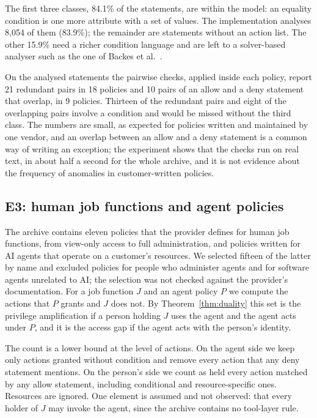 \documentclass[preprint,12pt]{elsarticle}
\theoremstyle{definition}
\theoremstyle{remark}
\begin{document}
The first three classes, 84.1\% of the statements, are within the model: an equality condition is one more attribute with a set of values. The implementation analyses 8,054 of them (83.9\%); the remainder are statements without an action list. The other 15.9\% need a richer condition language and are left to a solver-based analyser such as the one of Backes et al.~\cite{backes2018zelkova}.

On the analysed statements the pairwise checks, applied inside each policy, report 21 redundant pairs in 18 policies and 10 pairs of an allow and a deny statement that overlap, in 9 policies. Thirteen of the redundant pairs and eight of the overlapping pairs involve a condition and would be missed without the third class. The numbers are small, as expected for policies written and maintained by one vendor, and an overlap between an allow and a deny statement is a common way of writing an exception; the experiment shows that the checks run on real text, in about half a second for the whole archive, and it is not evidence about the frequency of anomalies in customer-written policies.

\subsection{E3: human job functions and agent policies}
The archive contains eleven policies that the provider defines for human job functions, from view-only access to full administration, and policies written for AI agents that operate on a customer's resources. We selected fifteen of the latter by name and excluded policies for people who administer agents and for software agents unrelated to AI; the selection was not checked against the provider's documentation. For a job function $J$ and an agent policy $P$ we compute the actions that $P$ grants and $J$ does not. By Theorem~\ref{thm:duality} this set is the privilege amplification if a person holding $J$ uses the agent and the agent acts under $P$, and it is the access gap if the agent acts with the person's identity.

The count is a lower bound at the level of actions. On the agent side we keep only actions granted without condition and remove every action that any deny statement mentions. On the person's side we count as held every action matched by any allow statement, including conditional and resource-specific ones. Resources are ignored. One element is assumed and not observed: that every holder of $J$ may invoke the agent, since the archive contains no tool-layer rule.
\end{document}
